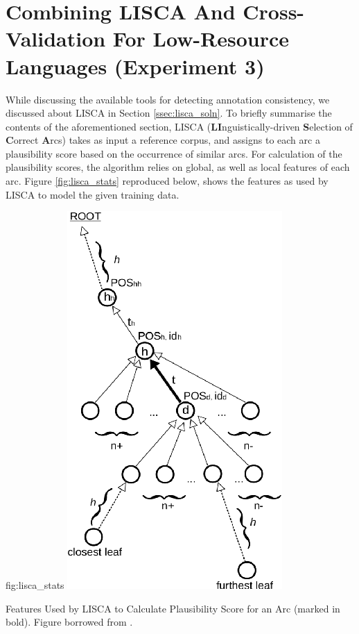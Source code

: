 \chapter{Combining LISCA And Cross-Validation For Low-Resource Languages (Experiment 3)}
\label{chap:lisca}

While discussing the available tools for detecting annotation consistency, we discussed about LISCA \citep{lisca} in Section \ref{ssec:lisca_soln}. To briefly summarise the contents of the aforementioned section, LISCA (\textbf{LI}nguistically-driven \textbf{S}election of \textbf{C}orrect \textbf{A}rcs) takes as input a reference corpus, and assigns to each arc a plausibility score based on the occurrence of similar arcs. For calculation of the plausibility scores, the algorithm relies on global, as well as local features of each arc. Figure \ref{fig:lisca_stats} reproduced below, shows the features as used by LISCA to model the given training data.

\begin{reusefigure}[H]{fig:lisca_stats}
    \centering
    \includegraphics[scale=0.5]{img/lisca_stats.png}
    \caption[Features Used by LISCA to Calculate Plausibility Score for an Arc]{Features Used by LISCA to Calculate Plausibility Score for an Arc (marked in bold). Figure borrowed from \cite{alzetta2017dangerous}. }
\end{reusefigure}

